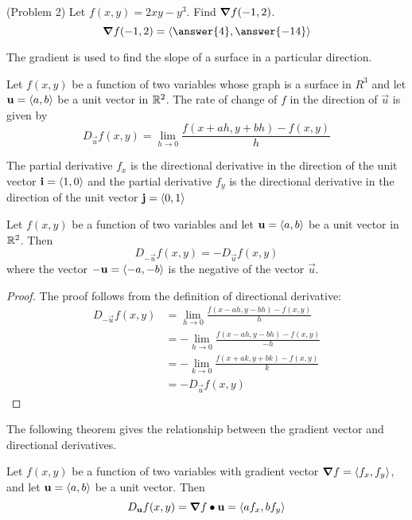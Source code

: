 \documentclass[handout]{ximera}
\begin{document}
\begin{problem}(Problem 2)
Let $f(x,y) = 2xy - y^3$.  Find $\boldsymbol\nabla f(-1, 2)$.\\
\[
\grad f(-1, 2) = \vector{\answer{4}, \answer{-14}}
\]
\end{problem}
The gradient is used to find the slope of a surface in a particular direction.

\begin{definition}
Let $f(x,y)$ be a function of two variables whose graph is a surface in $R^3$ and let $\mathbf u = \left\langle a,b\right\rangle$ be a unit vector in $\mathbb R^2$.
The rate of change of $f$ in the direction of $\vec u$ is given by
\[
D_{\vec u} f(x,y) = \lim_{h \to 0} \frac{f(x + ah, y + bh) -f(x,y)}{h}
\]
\end{definition}


\begin{remark}
The partial derivative $f_x$ is the directional derivative in the direction of the unit vector $\mathbf i = \left\langle 1,0\right\rangle$ and 
the partial derivative $f_y$ is the directional derivative in the direction of the unit vector $\mathbf j = \left\langle 0,1\right\rangle$
\end{remark}

\begin{proposition}
Let $f(x,y)$ be a function of two variables and let $\mathbf u = \left\langle a,b\right\rangle$ be a unit vector in $\mathbb R^2$. Then
\[
D_{-\vec u} f(x,y) = -D_{\vec u} f(x,y)
\]
where the vector $-\mathbf u = \left\langle -a, -b\right\rangle$ is the negative of the vector $\vec u$.
\end{proposition}

\begin{proof}
The proof follows from the definition of directional derivative:
\begin{align*}
D_{-\vec u} f(x,y) &= \lim_{h \to 0} \frac{f(x - ah, y - bh) -f(x,y)}{h} \\
                   &= -\lim_{h \to 0} \frac{f(x - ah, y - bh) -f(x,y)}{-h} \\
                   &= -\lim_{k \to 0} \frac{f(x + ak, y  + bk) -f(x,y)}{k} \\
                   &= -D_{\vec u} f(x,y)
\end{align*}
\end{proof}

The following theorem gives the relationship between the gradient vector and directional derivatives.

\begin{theorem}
Let $f(x,y)$ be a function of two variables with gradient vector $\boldsymbol\nabla f = \left\langle f_x, f_y\right\rangle$, and let $\mathbf u = \left\langle a,b\right\rangle$ be a unit vector.
Then
\[
D_{\mathbf u} f(x,y) = \boldsymbol\nabla f \bullet \mathbf u = \left\langle af_x, bf_y\right\rangle
\]
\end{theorem}
\end{document}
